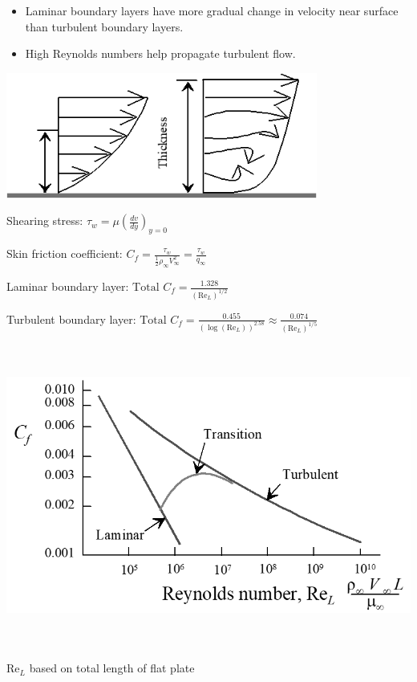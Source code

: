 \documentclass[
]{book}
\providecommand{\tightlist}{%
  \setlength{\itemsep}{0pt}\setlength{\parskip}{0pt}}
\begin{document}
\begin{itemize}
\tightlist
\item
  Laminar boundary layers have more gradual change in velocity near surface than turbulent boundary layers.
\item
  High Reynolds numbers help propagate turbulent flow.
\end{itemize}

\includegraphics[width=4.033in,height=1.625in]{media/05/image38.png}

Shearing stress: \(\tau_w = \mu \left(\frac{dv}{dy}\right)_{y=0}\)

Skin friction coefficient: \(C_f = \frac{\tau_w}{\frac{1}{2}\rho_{\infty} V_{\infty}^2} = \frac{\tau_w}{q_{\infty}}\)

Laminar boundary layer: \(\text{Total } C_f = \frac{1.328}{\left(\mathrm{Re}_L \right)^{1/2}}\)

Turbulent boundary layer: \(\text{Total } C_f = \frac{0.455}{\left(\log(\mathrm{Re}_L)\right)^{2.58}} \approx \frac{0.074}{\left(\mathrm{Re}_L\right)^{1/5}}\)

\includegraphics[width=6.699in,height=3.906in]{media/05/image43.png}

\(\mathrm{Re}_L\) based on total length of flat plate
\end{document}
